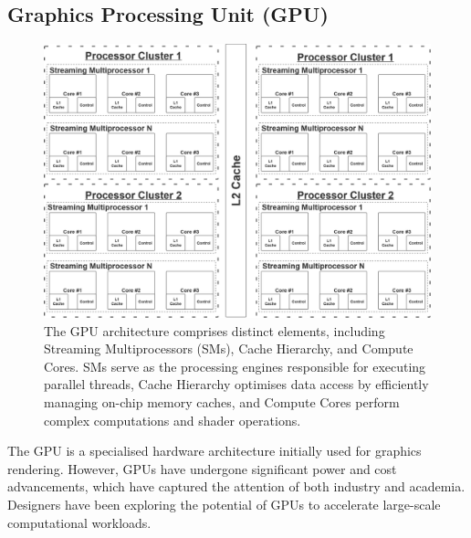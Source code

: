



\subsection{Graphics Processing Unit (GPU)}
\begin{figure}[h]
\centering
\includegraphics[width=\linewidth]{Images/GPU.png}
\caption[GPU Architecture]{ The GPU architecture comprises distinct elements, including Streaming Multiprocessors (SMs), Cache Hierarchy, and Compute Cores. SMs serve as the processing engines responsible for executing parallel threads, Cache Hierarchy optimises data access by efficiently managing on-chip memory caches, and Compute Cores perform complex computations and shader operations.}
\label{fig:GPU}
\end{figure} 
The GPU is a specialised hardware architecture initially used for graphics rendering. However, GPUs have undergone significant power and cost advancements, which have captured the attention of both industry and academia. Designers have been exploring the potential of GPUs to accelerate large-scale computational workloads. 

